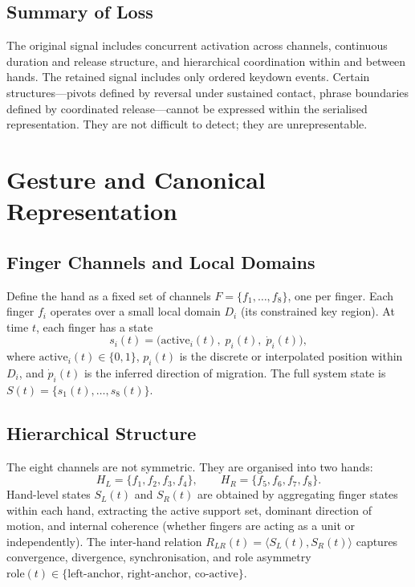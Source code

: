 \documentclass[11pt, a4paper]{article}
\begin{document}
\subsection{Summary of Loss}

The original signal includes concurrent activation across channels,
continuous duration and release structure, and hierarchical coordination
within and between hands. The retained signal includes only ordered
keydown events. Certain structures---pivots defined by reversal under
sustained contact, phrase boundaries defined by coordinated
release---cannot be expressed within the serialised representation. They
are not difficult to detect; they are unrepresentable.

\section{Gesture and Canonical Representation}

\subsection{Finger Channels and Local Domains}

Define the hand as a fixed set of channels $F = \{f_1, \ldots, f_8\}$,
one per finger. Each finger $f_i$ operates over a small local domain
$D_i$ (its constrained key region). At time $t$, each finger has a state
\[
  s_i(t) = \bigl(\mathrm{active}_i(t),\; p_i(t),\; \dot{p}_i(t)\bigr),
\]
where $\mathrm{active}_i(t) \in \{0,1\}$, $p_i(t)$ is the discrete or
interpolated position within $D_i$, and $\dot{p}_i(t)$ is the inferred
direction of migration. The full system state is
$S(t) = \{s_1(t), \ldots, s_8(t)\}$.

\subsection{Hierarchical Structure}

The eight channels are not symmetric. They are organised into two hands:
\[
  H_L = \{f_1, f_2, f_3, f_4\}, \qquad H_R = \{f_5, f_6, f_7, f_8\}.
\]
Hand-level states $S_L(t)$ and $S_R(t)$ are obtained by aggregating
finger states within each hand, extracting the active support set,
dominant direction of motion, and internal coherence (whether fingers are
acting as a unit or independently). The inter-hand relation
$R_{LR}(t) = \langle S_L(t), S_R(t)\rangle$ captures convergence,
divergence, synchronisation, and role asymmetry
$\mathrm{role}(t) \in \{\text{left-anchor},\, \text{right-anchor},\,
\text{co-active}\}$.
\end{document}
